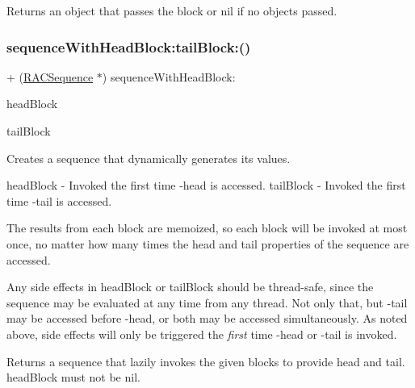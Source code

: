 Returns an object that passes the block or nil if no objects passed. \mbox{\label{interface_r_a_c_sequence_a20ccbd1419a168a74a10a83dfa88e62e}} 
\subsubsection{\texorpdfstring{sequence\+With\+Head\+Block\+:tail\+Block\+:()}{sequenceWithHeadBlock:tailBlock:()}\hspace{0.1cm}{\footnotesize\ttfamily [1/3]}}
{\footnotesize\ttfamily + (\mbox{\hyperlink{interface_r_a_c_sequence}{R\+A\+C\+Sequence}} $\ast$) sequence\+With\+Head\+Block\+: \begin{DoxyParamCaption}\item[{(id($^\wedge$)(void))}]{head\+Block }\item[{tailBlock:(\mbox{\hyperlink{interface_r_a_c_sequence}{R\+A\+C\+Sequence}} $\ast$($^\wedge$)(void))}]{tail\+Block }\end{DoxyParamCaption}}

Creates a sequence that dynamically generates its values.

head\+Block -\/ Invoked the first time -\/head is accessed. tail\+Block -\/ Invoked the first time -\/tail is accessed.

The results from each block are memoized, so each block will be invoked at most once, no matter how many times the head and tail properties of the sequence are accessed.

Any side effects in {\ttfamily head\+Block} or {\ttfamily tail\+Block} should be thread-\/safe, since the sequence may be evaluated at any time from any thread. Not only that, but -\/tail may be accessed before -\/head, or both may be accessed simultaneously. As noted above, side effects will only be triggered the {\itshape first} time -\/head or -\/tail is invoked.

Returns a sequence that lazily invokes the given blocks to provide head and tail. {\ttfamily head\+Block} must not be nil. \mbox{\label{interface_r_a_c_sequence_a20ccbd1419a168a74a10a83dfa88e62e}} 
